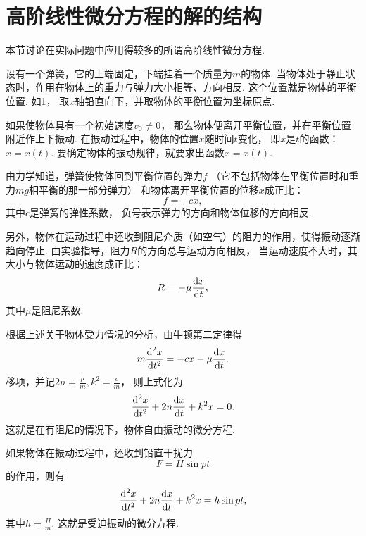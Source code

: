 \section{高阶线性微分方程的解的结构}
本节讨论在实际问题中应用得较多的所谓高阶线性微分方程.

\begin{figure}[ht]
	\centering
	\caption{}
	\label{figure:微分方程.重力场中的弹簧振子模型}
\end{figure}
\begin{example}
设有一个弹簧，它的上端固定，下端挂着一个质量为\(m\)的物体.
当物体处于静止状态时，作用在物体上的重力与弹力大小相等、方向相反.
这个位置就是物体的平衡位置.
如\cref{figure:微分方程.重力场中的弹簧振子模型}，
取\(x\)轴铅直向下，并取物体的平衡位置为坐标原点.

如果使物体具有一个初始速度\(v_0\neq0\)，
那么物体便离开平衡位置，并在平衡位置附近作上下振动.
在振动过程中，物体的位置\(x\)随时间\(t\)变化，
即\(x\)是\(t\)的函数：\(x=x(t)\).
要确定物体的振动规律，就要求出函数\(x=x(t)\).

由力学知道，弹簧使物体回到平衡位置的弹力\(f\)
（它不包括物体在平衡位置时和重力\(mg\)相平衡的那一部分弹力）
和物体离开平衡位置的位移\(x\)成正比：\[
	f = -cx,
\]
其中\(c\)是弹簧的弹性系数，
负号表示弹力的方向和物体位移的方向相反.

另外，物体在运动过程中还收到阻尼介质（如空气）的阻力的作用，使得振动逐渐趋向停止.
由实验指导，阻力\(R\)的方向总与运动方向相反，
当运动速度不大时，其大小与物体运动的速度成正比：\[
	R = -\mu \dv{x}{t},
\]
其中\(\mu\)是阻尼系数.

根据上述关于物体受力情况的分析，由牛顿第二定律得\[
	m \dv[2]{x}{t} = -cx -\mu \dv{x}{t}.
\]
移项，并记\(2n=\frac{\mu}{m},
k^2=\frac{c}{m}\)，
则上式化为\[
	\dv[2]{x}{t}+2n\dv{x}{t}+k^2x=0.
\]
这就是在有阻尼的情况下，物体自由振动的微分方程.

如果物体在振动过程中，还收到铅直干扰力\[
	F = H \sin pt
\]的作用，则有\[
	\dv[2]{x}{t} + 2n \dv{x}{t} + k^2x = h \sin pt,
\]
其中\(h=\frac{H}{m}\).
这就是受迫振动的微分方程.
\end{example}

